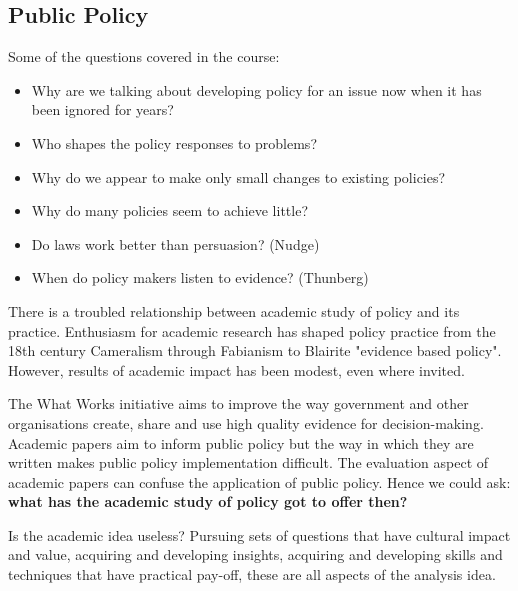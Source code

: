 \documentclass[12pt, letterpaper]{article}
\begin{document}
{\subsection{Public Policy}
Some of the questions covered in the course:
\begin{itemize}
	\item Why are we talking about developing policy for an issue now when it has been ignored for years?
	\item Who shapes the policy responses to problems?
	\item Why do we appear to make only small changes to existing policies?
	\item Why do many policies seem to achieve little?
	\item Do laws work better than persuasion? (Nudge)
	\item When do policy makers listen to evidence? (Thunberg)
\end{itemize}
There is a troubled relationship between academic study of policy and its practice. Enthusiasm for academic research has shaped policy practice from the 18th century Cameralism through Fabianism to Blairite "evidence based policy". However, results of academic impact has been modest, even where invited.

\vspace{10pt}
\noindent The What Works initiative aims to improve the way government and other organisations create, share and use high quality evidence for decision-making. Academic papers aim to inform public policy but the way in which they are written makes public policy implementation difficult. The evaluation aspect of academic papers can confuse the application of public policy. Hence we could ask: \textbf{what has the academic study of policy got to offer then?}

\vspace{10pt}
\noindent Is the academic idea useless? Pursuing sets of questions that have cultural impact and value, acquiring and developing insights, acquiring and developing skills and techniques that have practical pay-off, these are all aspects of the analysis idea.

}
\end{document}
